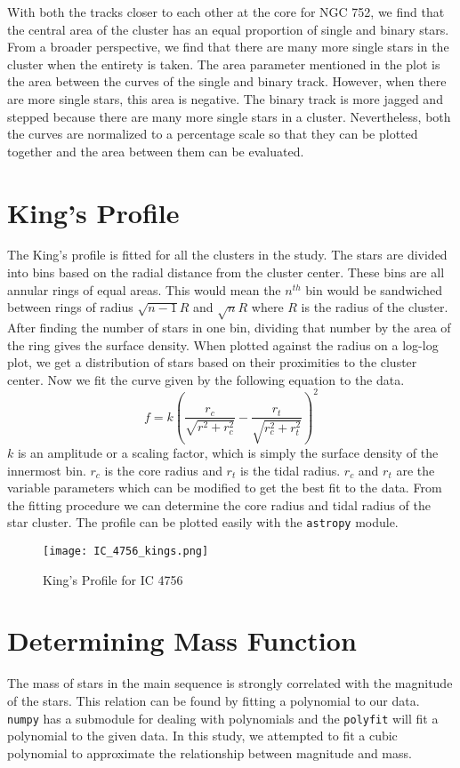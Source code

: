 With both the tracks closer to each other at the core for NGC 752, we find that the central area of the cluster has an equal proportion of single and binary stars. From a broader perspective, we find that there are many more single stars in the cluster when the entirety is taken. The area parameter mentioned in the plot is the area between the curves of the single and binary track. However, when there are more single stars, this area is negative. The binary track is more jagged and stepped because there are many more single stars in a cluster. Nevertheless, both the curves are normalized to a percentage scale so that they can be plotted together and the area between them can be evaluated.

\section{King's Profile}
The King's profile\citep{kingprofile} is fitted for all the clusters in the study. The stars are divided into bins based on the radial distance from the cluster center. These bins are all annular rings of equal areas. This would mean the $n^{th}$ bin would be sandwiched between rings of radius $\sqrt{n-1}R$ and $\sqrt{n}R$ where $R$ is the radius of the cluster. After finding the number of stars in one bin, dividing that number by the area of the ring gives the surface density. When plotted against the radius on a log-log plot, we get a distribution of stars based on their proximities to the cluster center. Now we fit the curve given by the following equation to the data.
$$f = k \left( \frac{r_c}{\sqrt{r^2+r_c^2}} - \frac{r_t}{\sqrt{r_c^2+r_t^2}} \right) ^2$$
$k$ is an amplitude or a scaling factor, which is simply the surface density of the innermost bin. $r_c$ is the core radius and $r_t$ is the tidal radius.  $r_c$ and $r_t$ are the variable parameters which can be modified to get the best fit to the data. From the fitting procedure we can determine the core radius and tidal radius of the star cluster. The profile can be plotted easily with the \lstinline{astropy} {} module.

\begin{figure}[h]
	\centering
	\texttt{[image: IC\_4756\_kings.png]}
	\caption{King's Profile for IC 4756}
	\label{fig:im6}
\end{figure}


\section{Determining Mass Function}
The mass of stars in the main sequence is strongly correlated with the magnitude of the stars. This relation can be found by fitting a polynomial to our data. \lstinline{numpy} {}has a submodule for dealing with polynomials and the \lstinline{polyfit} {}will fit a polynomial to the given data. In this study, we attempted to fit a cubic polynomial to approximate the relationship between magnitude and mass. 

